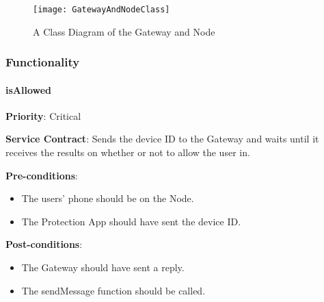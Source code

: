     \begin{figure}[H]
 			 \centering
			  \texttt{[image: GatewayAndNodeClass]}
		 	 \caption{A Class Diagram of the Gateway and Node}
		\end{figure}
		
    \subsubsection{Functionality}
        \paragraph{isAllowed}
			\begin{description}
			    \item{\textbf{Priority}:} Critical%
			    \item{\textbf{Service Contract}:} Sends the device ID to the Gateway and waits until it receives the results on whether or not to allow the user in.%
			    \item{\textbf{Pre-conditions}:}%
    			    \begin{itemize}
    			        \item The users' phone should be on the Node.
    			        \item The Protection App should have sent the device ID.
    			    \end{itemize}
			    \item{\textbf{Post-conditions}:} %
    			    \begin{itemize}
    			        \item The Gateway should have sent a reply.
    			        \item The sendMessage function should be called.
    			    \end{itemize}
			\end{description}

